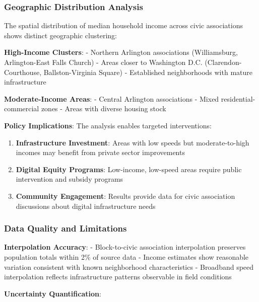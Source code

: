 \documentclass[
  letterpaper,
  DIV=11,
  numbers=noendperiod]{scrartcl}
\providecommand{\tightlist}{%
  \setlength{\itemsep}{0pt}\setlength{\parskip}{0pt}}
\begin{document}
\subsubsection{Geographic Distribution
Analysis}\label{geographic-distribution-analysis}

The spatial distribution of median household income across civic
associations shows distinct geographic clustering:

\textbf{High-Income Clusters}: - Northern Arlington associations
(Williamsburg, Arlington-East Falls Church) - Areas closer to Washington
D.C. (Clarendon-Courthouse, Ballston-Virginia Square) - Established
neighborhoods with mature infrastructure

\textbf{Moderate-Income Areas}: - Central Arlington associations - Mixed
residential-commercial zones - Areas with diverse housing stock

\textbf{Policy Implications}: The analysis enables targeted
interventions:

\begin{enumerate}
\def\labelenumi{\arabic{enumi}.}
\tightlist
\item
  \textbf{Infrastructure Investment}: Areas with low speeds but
  moderate-to-high incomes may benefit from private sector improvements
\item
  \textbf{Digital Equity Programs}: Low-income, low-speed areas require
  public intervention and subsidy programs
\item
  \textbf{Community Engagement}: Results provide data for civic
  association discussions about digital infrastructure needs
\end{enumerate}

\subsubsection{Data Quality and
Limitations}\label{data-quality-and-limitations}

\textbf{Interpolation Accuracy}: - Block-to-civic association
interpolation preserves population totals within 2\% of source data -
Income estimates show reasonable variation consistent with known
neighborhood characteristics - Broadband speed interpolation reflects
infrastructure patterns observable in field conditions

\textbf{Uncertainty Quantification}:
\end{document}
